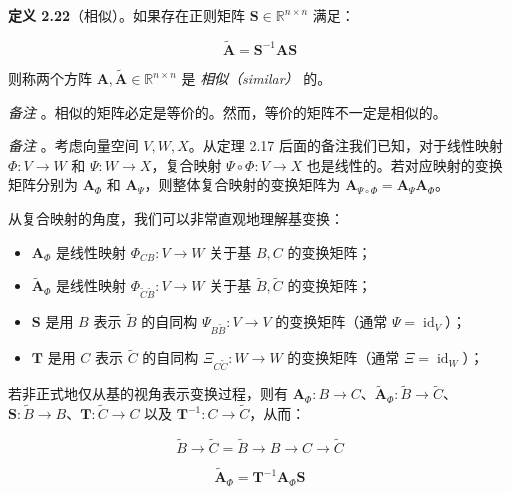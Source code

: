 \textbf{定义 2.22}（相似）。如果存在正则矩阵 $ \boldsymbol{S} \in \mathbb{R}^{n \times n} $ 满足：

\begin{equation*}
\tilde{\boldsymbol{A}} = \boldsymbol{S}^{-1} \boldsymbol{A} \boldsymbol{S}
\end{equation*}

则称两个方阵 $ \boldsymbol{A}, \tilde{\boldsymbol{A}} \in \mathbb{R}^{n \times n} $ 是 \emph{相似（similar）} 的。

\emph{备注} 。相似的矩阵必定是等价的。然而，等价的矩阵不一定是相似的。

\emph{备注} 。考虑向量空间 $ V, W, X $。从定理 2.17 后面的备注我们已知，对于线性映射 $ \Phi : V \to W $ 和 $ \Psi : W \to X $，复合映射 $ \Psi \circ \Phi : V \to X $ 也是线性的。若对应映射的变换矩阵分别为 $ \boldsymbol{A}_\Phi $ 和 $ \boldsymbol{A}_\Psi $，则整体复合映射的变换矩阵为 $ \boldsymbol{A}_{\Psi \circ \Phi} = \boldsymbol{A}_\Psi \boldsymbol{A}_\Phi $。

从复合映射的角度，我们可以非常直观地理解基变换：

\begin{itemize}
\item $ \boldsymbol{A}_\Phi $ 是线性映射 $ \Phi_{CB} : V \to W $ 关于基 $ B, C $ 的变换矩阵；
\item $ \tilde{\boldsymbol{A}}_\Phi $ 是线性映射 $ \Phi_{\tilde{C}\tilde{B}} : V \to W $ 关于基 $ \tilde{B}, \tilde{C} $ 的变换矩阵；
\item $ \boldsymbol{S} $ 是用 $ B $ 表示 $ \tilde{B} $ 的自同构 $ \Psi_{B\tilde{B}} : V \to V $ 的变换矩阵（通常 $ \Psi = \operatorname{id}_V $）；
\item $ \boldsymbol{T} $ 是用 $ C $ 表示 $ \tilde{C} $ 的自同构 $ \Xi_{C\tilde{C}} : W \to W $ 的变换矩阵（通常 $ \Xi = \operatorname{id}_W $）；
\end{itemize}

若非正式地仅从基的视角表示变换过程，则有 $ \boldsymbol{A}_\Phi : B \to C $、$ \tilde{\boldsymbol{A}}_\Phi : \tilde{B} \to \tilde{C} $、$ \boldsymbol{S} : \tilde{B} \to B $、$ \boldsymbol{T} : \tilde{C} \to C $ 以及 $ \boldsymbol{T}^{-1} : C \to \tilde{C} $，从而：

\begin{equation}
\tilde{B} \to \tilde{C} = \tilde{B} \to B \to C \to \tilde{C}
\tag{2.115}\label{eq:2-115}
\end{equation}

\begin{equation}
\tilde{\boldsymbol{A}}_\Phi = \boldsymbol{T}^{-1} \boldsymbol{A}_\Phi \boldsymbol{S}
\tag{2.116}\label{eq:2-116}
\end{equation}

